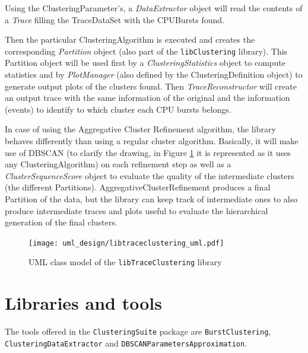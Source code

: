 \documentclass[a4paper, 12pt]{article}
\begin{document}
Using the ClusteringParameter's, a \textit{DataExtractor} object will read 
the contents of a \textit{Trace} filling the TraceDataSet with the CPUBursts
found.

Then the particular ClusteringAlgorithm is executed and creates the 
corresponding \textit{Partition} object (also part of the \texttt{libClustering}
library). This Partition object will be used first by a \textit{ClusteringStatistics} 
object to compute statistics and by \textit{PlotManager}
(also defined by the ClusteringDefinition object) to generate output plots
of the clusters found. Then \textit{TraceReconstructor} will create an output
trace with the same information of the original and the information 
(events) to identify to which cluster each CPU bursts belongs.

In case of using the Aggregative Cluster Refinement algorithm, the
library behaves differently than using a regular cluster algorithm. 
Basically, it will make use of DBSCAN (to clarify the drawing, in 
Figure \ref{fig:libtraceclustering_uml} it is represented as it uses any 
ClusteringAlgorithm) on each refinement step as well as a \textit{ClusterSequenceScore}
object to evaluate the quality of the intermediate clusters (the different
Partitions). AggregativeClusterRefinement produces a final Partition of the 
data, but the library can keep track of intermediate ones to also produce 
intermediate traces and plots useful to evaluate the hierarchical generation
of the final clusters.

\begin{figure}
  \centering
  \texttt{[image: uml\_design/libtraceclustering\_uml.pdf]}
  \caption{UML class model of the \texttt{libTrace\-Clustering} library}
  \label{fig:libtraceclustering_uml}
\end{figure}

\section{Libraries and tools}

The tools offered in the \texttt{ClusteringSuite} package are
\texttt{BurstClustering}, \texttt{Clustering\-DataExtractor} and
\texttt{DBSCANParametersApproximation}.
\end{document}
